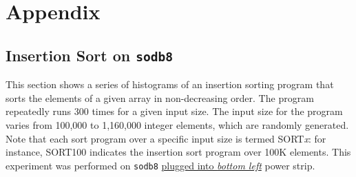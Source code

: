 \documentclass[10pt]{article}
\begin{document}
\newpage
\pagebreak

\section{Appendix}

\subsection{Insertion Sort on {\tt sodb8}~\label{sec:add_new}} 
This section shows a series of histograms of an insertion sorting program that 
sorts the elements of a given array in non-decreasing order. 
The program repeatedly runs 300 times for a given input size. 
The input size for the program 
varies from 100,000 to 1,160,000 integer elements, which are randomly generated. 
Note that each sort program over a specific input size is termed SORT{\it x}: 
for instance, SORT100 indicates the insertion sort program over 100K elements. 
This experiment was performed on {\tt sodb8} \underline{plugged into {\em bottom left}} power strip.
\end{document}
